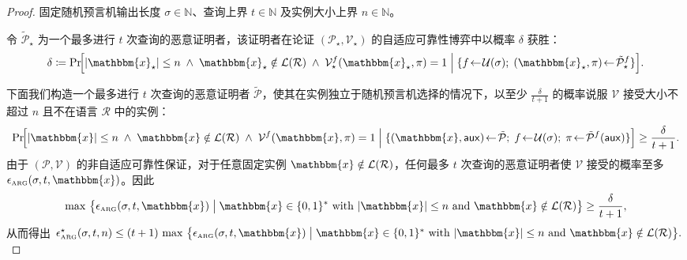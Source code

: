\documentclass[american,singlepageview]{snargs-book-zh}
\newcommand{\Bits}{\{0,1\}}
\newcommand{\Malicious}[1]{\tilde{#1}}
\newcommand{\DefineEqual}{\coloneqq}
\newcommand{\AuxiliaryState}{\mathsf{aux}}
\newcommand{\SomeSize}[1]{|#1|}
\newcommand{\Naturals}{\mathbb{N}}
\newcommand{\Relation}{\mathcal{R}}
\newcommand{\Language}{\mathcal{L}}
\newcommand{\GetLanguage}[1]{\Language(#1)}
\newcommand{\Instance}{\mathbbm{x}}
\newcommand{\InstanceSize}{n}
\newcommand{\ProtoProver}{P}
\newcommand{\ProtoVerifier}{V}
\newcommand{\ProtoSoundnessError}{\epsilon}
\newcommand{\ARGSubscript}{\scriptscriptstyle\mathrm{ARG}}
\newcommand{\ARGFormat}[1]{\mathcal{#1}}
\newcommand{\ARGProver}{\ARGFormat{\ProtoProver}}
\newcommand{\ARGVerifier}{\ARGFormat{\ProtoVerifier}}
\newcommand{\ARGString}{\pi}
\newcommand{\ARGNASoundnessError}{\ProtoSoundnessError_{\ARGSubscript}}
\newcommand{\ARGSoundnessError}{\ProtoSoundnessError_{\ARGSubscript}}
\newcommand{\ROFunction}{f}
\newcommand{\ROQueryBound}{t}
\newcommand{\RODistribution}[1]{\mathcal{U}(#1)}
\newcommand{\ROAdvState}{\AuxiliaryState}
\newcommand{\ROOutputSize}{\sigma}
\newcommand{\MaxSoundness}[1]{\max\, \big\{ #1 \;\big\vert\;\Instance \in \Bits^{*} \text{ with } \SomeSize{\Instance} \leq \InstanceSize \text{ and } \Instance \notin \GetLanguage{\Relation} \big\}}
\begin{document}
\begin{proof}
固定随机预言机输出长度 $\ROOutputSize\in\Naturals$、查询上界 $\ROQueryBound\in\Naturals$ 及实例大小上界 $\InstanceSize\in\Naturals$。

令 $\Malicious{\ARGProver}_{\star}$ 为一个最多进行 $\ROQueryBound$ 次查询的恶意证明者，该证明者在论证 $(\ARGProver_{\star},\ARGVerifier_{\star})$ 的自适应可靠性博弈中以概率 $\delta$ 获胜：
\[
\delta \DefineEqual
\Pr\!\Bigl[
  \SomeSize{\Instance_{\star}}\le\InstanceSize
  \;\wedge\;
  \Instance_{\star}\notin\GetLanguage{\Relation}
  \;\wedge\;
  \ARGVerifier_{\star}^{\ROFunction}(\Instance_{\star},\ARGString)=1
  \;\Big|\;
  \{
    \ROFunction\!\gets\!\RODistribution{\ROOutputSize};\;
    (\Instance_{\star},\ARGString)\!\gets\!\Malicious{\ARGProver}_{\star}^{\ROFunction}
  \}
\Bigr].
\]

下面我们构造一个最多进行 $\ROQueryBound$ 次查询的恶意证明者 $\Malicious{\ARGProver}$，使其在实例独立于随机预言机选择的情况下，以至少 $\frac{\delta}{\ROQueryBound+1}$ 的概率说服 $\ARGVerifier$ 接受大小不超过 $\InstanceSize$ 且不在语言 $\Relation$ 中的实例：
\[
\Pr\!\Bigl[
  \SomeSize{\Instance}\le\InstanceSize
  \;\wedge\;
  \Instance\notin\GetLanguage{\Relation}
  \;\wedge\;
  \ARGVerifier^{\ROFunction}(\Instance,\ARGString)=1
  \;\Big|\;
  \{
    (\Instance,\ROAdvState)\!\gets\!\Malicious{\ARGProver};\;
    \ROFunction\!\gets\!\RODistribution{\ROOutputSize};\;
    \ARGString\!\gets\!\Malicious{\ARGProver}^{\ROFunction}(\ROAdvState)
  \}
\Bigr]
\ge
\frac{\delta}{\ROQueryBound+1}.
\]
由于 $(\ARGProver,\ARGVerifier)$ 的非自适应可靠性保证，对于任意固定实例 $\Instance\notin\GetLanguage{\Relation}$，任何最多 $\ROQueryBound$ 次查询的恶意证明者使 $\ARGVerifier$ 接受的概率至多 $\ARGNASoundnessError(\ROOutputSize,\ROQueryBound,\Instance)$。因此
\[
\MaxSoundness{\ARGNASoundnessError(\ROOutputSize,\ROQueryBound,\Instance)}
\ge
\frac{\delta}{\ROQueryBound+1},
\]
从而得出
\(
\ARGSoundnessError^{\star}(\ROOutputSize,\ROQueryBound,\InstanceSize)
\le
(\ROQueryBound+1)\,\MaxSoundness{\ARGNASoundnessError(\ROOutputSize,\ROQueryBound,\Instance)}.
\)


\end{proof}
\end{document}
